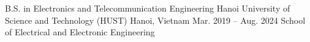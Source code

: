
\begin{cventries}

  \cventry
  {B.S. in Electronics and Telecommunication Engineering} %
  {Hanoi University of Science and Technology (HUST)} %
  {Hanoi, Vietnam} %
  {Mar. 2019 -- Aug. 2024} %
  {School of Electrical and Electronic Engineering}

\end{cventries}
